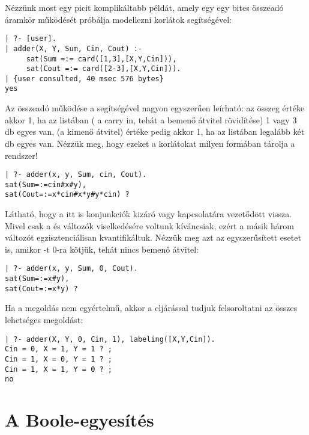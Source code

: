Nézzünk most egy picit komplikáltabb \clpb példát, amely egy egy bites
összeadó áramkör működését próbálja modellezni \clpb korlátok segítségével:

\begin{verbatim}
| ?- [user].
| adder(X, Y, Sum, Cin, Cout) :-
     sat(Sum =:= card([1,3],[X,Y,Cin])),
     sat(Cout =:= card([2-3],[X,Y,Cin])).
| {user consulted, 40 msec 576 bytes}
yes
\end{verbatim}

Az összeadó működése a  segítségével nagyon egyszerűen leírható:
az összeg értéke akkor 1, ha az \cd{[X,Y,Cin]} listában ( a carry in,
tehát a bemenő átvitel rövidítése) 1 vagy 3 db egyes van, 
(a kimenő átvitel) értéke pedig akkor 1, ha az \cd{[X,Y,Cin]} listában legalább
két db egyes van. Nézzük meg, hogy ezeket a korlátokat milyen formában tárolja
a \clpb rendszer!

\begin{verbatim}
| ?- adder(x, y, Sum, cin, Cout).
sat(Sum=:=cin#x#y),
sat(Cout=:=x*cin#x*y#y*cin) ?
\end{verbatim}

Látható, hogy a  itt is konjunkciók kizáró vagy kapcsolatára
vezetődött vissza. Mivel csak a  és  változók viselkedésére
voltunk kíváncsiak, ezért a másik három változót egzisztenciálisan
kvantifikáltuk. Nézzük meg azt az egyszerűsített esetet is, amikor -t
0-ra kötjük, tehát nincs bemenő átvitel:

\begin{verbatim}
| ?- adder(x, y, Sum, 0, Cout).
sat(Sum=:=x#y),
sat(Cout=:=x*y) ?
\end{verbatim}

Ha a megoldás nem egyértelmű, akkor a  eljárással tudjuk
felsoroltatni az összes lehetséges megoldást:

\begin{verbatim}
| ?- adder(X, Y, 0, Cin, 1), labeling([X,Y,Cin]).
Cin = 0, X = 1, Y = 1 ? ; 
Cin = 1, X = 0, Y = 1 ? ;
Cin = 1, X = 1, Y = 0 ? ;
no
\end{verbatim}

\section{A Boole-egyesítés}

